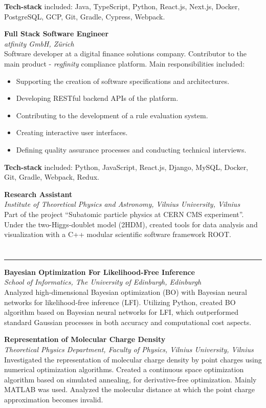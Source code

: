 \documentclass[fontsize=10pt]{article}
\let\oldsection\section
\renewcommand\section[1]{%
	\vspace{0.75\baselineskip}
    \oldsection{\color{Brown}{#1}}%
	\vspace{-0.5\baselineskip}
    \hrule height 0.75pt
    \vspace{0.75\baselineskip}
}
\newcommand\position[3]{
	\vspace{\baselineskip}
	{\large\textbf{#1}}\\[2.5pt]%
	\textit{#2}%
	\hspace*{\fill{\textit{#3}}}\\[5pt]%
}
\begin{document}
\textbf{Tech-stack} included: Java, TypeScript, Python, React.js, Next.js, Docker, PostgreSQL, GCP, Git, Gradle, Cypress, Webpack.
\vspace{0.75\baselineskip}

\position{Full Stack Software Engineer}{atfinity GmbH, Z{\"u}rich}{2018 07 -- 2019 11}
Software developer at a digital finance solutions company. Contributor to the main product - \textit{regfinity} compliance platform. Main responsibilities included:
\begin{itemize}
\setlength\itemsep{0pt}
	\item{Supporting the creation of software specifications and architectures.}
	\item{Developing RESTful backend APIs of the platform.}
	\item{Contributing to the development of a rule evaluation system.}
	\item{Creating interactive user interfaces.}
	\item{Defining quality assurance processes and conducting technical interviews.}
\end{itemize}

\textbf{Tech-stack} included: Python, JavaScript, React.js, Django, MySQL, Docker, Git, Gradle, Webpack, Redux.

\vspace{\baselineskip}

\position{Research Assistant}{Institute of Theoretical Physics and Astronomy, Vilnius University, Vilnius}{2015 07 -- 2015 08}
Part of the project ``Subatomic particle physics at CERN CMS experiment''. Under the two-Higgs-doublet model (2HDM), created tools 
for data analysis and visualization with a C++ modular scientific software framework ROOT.


\section{Research Experience}
\position{Bayesian Optimization For Likelihood-Free Inference}{School of Informatics, The University of Edinburgh, Edinburgh}{2016 -- 2017}
Analyzed high-dimensional Bayesian optimization (BO) with Bayesian neural networks for likelihood-free inference (LFI). 
Utilizing Python, created BO algorithm based on Bayesian neural networks for LFI, which outperformed standard Gaussian 
processes in both accuracy and computational cost aspects.
\vspace{0.75\baselineskip}


\position{Representation of Molecular Charge Density}{Theoretical Physics Department, Faculty of Physics, Vilnius University, Vilnius}{2015 -- 2016}
Investigated the representation of molecular charge density by point charges using numerical optimization algorithms. Created 
a continuous space optimization algorithm based on simulated annealing, for derivative-free optimization. Mainly MATLAB was 
used. Analyzed the molecular distance at which the point charge approximation becomes invalid.
\end{document}
